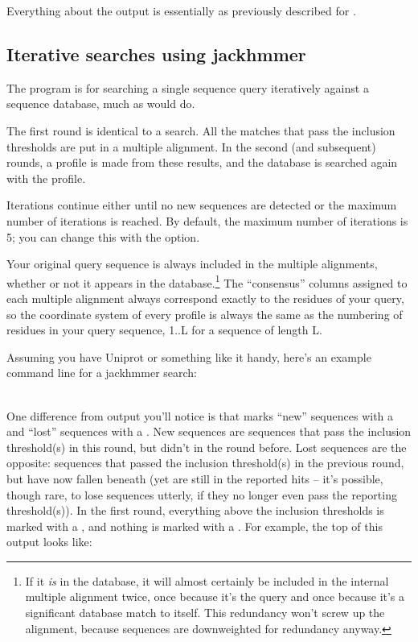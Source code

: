 Everything about the output is essentially as previously described for
. 


\subsection{Iterative searches using jackhmmer}

The  program is for searching a single sequence query
iteratively against a sequence database, much as 
would do. 

The first round is identical to a  search. All the
matches that pass the inclusion thresholds are put in a multiple
alignment. In the second (and subsequent) rounds, a profile is made
from these results, and the database is searched again with the
profile.

Iterations continue either until no new sequences are detected or the
maximum number of iterations is reached. By default, the maximum
number of iterations is 5; you can change this with the 
option.

Your original query sequence is always included in the multiple
alignments, whether or not it appears in the database.\footnote{If it
  \emph{is} in the database, it will almost certainly be included in
  the internal multiple alignment twice, once because it's the query
  and once because it's a significant database match to itself. This
  redundancy won't screw up the alignment, because sequences are
  downweighted for redundancy anyway.}  
The ``consensus'' columns assigned to each multiple alignment always
correspond exactly to the residues of your query, so the coordinate
system of every profile is always the same as the numbering of
residues in your query sequence, 1..L for a sequence of length L.

Assuming you have Uniprot or something like it handy, here's an
example command line for a jackhmmer search:

\\

One difference from  output you'll notice is that
 marks ``new'' sequences with a \ccode{+} and ``lost''
sequences with a \ccode{-}. New sequences are sequences that pass the
inclusion threshold(s) in this round, but didn't in the round before.
Lost sequences are the opposite: sequences that passed the inclusion
threshold(s) in the previous round, but have now fallen beneath (yet
are still in the reported hits -- it's possible, though rare, to lose
sequences utterly, if they no longer even pass the reporting
threshold(s)).  In the first round, everything above the inclusion
thresholds is marked with a \ccode{+}, and nothing is marked with a
\ccode{-}. For example, the top of this output looks like:


